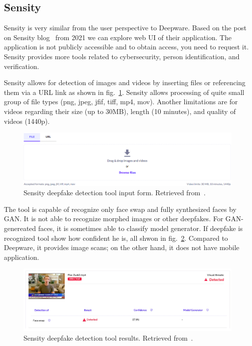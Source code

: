 \subsection{Sensity}

Sensity is very similar from the user perspective to Deepware. Based on the post on Sensity blog~\cite{HowToDetectADeepfakeOnline} from 2021 we can explore web UI of their application. The application is not publicly accessible and to obtain access, you need to request it. Sensity provides more tools related to cybersecurity, person identification, and verification. 

Sensity allows for detection of images and videos by inserting files or referencing them via a URL link as shown in fig.~\ref{fig:sensity_input}. Sensity allows processing of quite small group of file types (png, jpeg, jfif, tiff, mp4, mov). Another limitations are for videos regarding their size (up to 30MB), length (10 minutes), and quality of videos (1440p).~\cite{HowToDetectADeepfakeOnline}

\begin{figure}[H]
    \centering
    \includegraphics[width=.95\linewidth]{other-fig/sensity_input.png}
    \caption{Sensity deepfake detection tool input form. Retrieved from~\cite{HowToDetectADeepfakeOnline}.}
    \label{fig:sensity_input}
\end{figure}

The tool is capable of recognize only face swap and fully synthesized faces by GAN. It is not able to recognize morphed images or other deepfakes. For GAN-genereated faces, it is sometimes able to classify model generator. If deepfake is recognized tool show how confident he is, all shwon in fig.~\ref{fig:sensity_results}. Compared to Deepware, it provides image scans; on the other hand, it does not have mobile application.

\begin{figure}[H]
    \centering
    \includegraphics[width=.95\linewidth]{other-fig/sensity_results.png}
    \caption{Sensity deepfake detection tool results. Retrieved from~\cite{HowToDetectADeepfakeOnline}.}
    \label{fig:sensity_results}
\end{figure}

